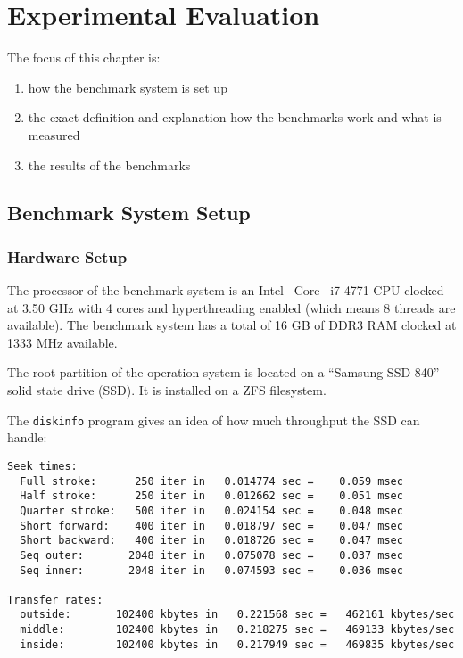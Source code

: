 \chapter{Experimental Evaluation}


The focus of this chapter is:
\begin{enumerate}
\item how the benchmark system is set up
\item the exact definition and explanation how the benchmarks work and what is measured
\item the results of the benchmarks
\end{enumerate}

%

\section{Benchmark System Setup}
  \subsection{Hardware Setup}

The processor of the benchmark system is an Intel\textregistered~ Core\texttrademark~ i7-4771 CPU clocked at 3.50 GHz with 4 cores and hyperthreading enabled (which means 8 threads are available).
The benchmark system has a total of 16 GB of DDR3 RAM clocked at 1333 MHz available.

The root partition of the operation system is located on a ``Samsung SSD 840'' solid state drive (SSD).
It is installed on a ZFS filesystem.

The \texttt{diskinfo} program gives an idea of how much throughput the SSD can handle:

\begin{lstlisting}[caption={Disk performance on the benchmark system}]
Seek times:
  Full stroke:      250 iter in   0.014774 sec =    0.059 msec
  Half stroke:      250 iter in   0.012662 sec =    0.051 msec
  Quarter stroke:   500 iter in   0.024154 sec =    0.048 msec
  Short forward:    400 iter in   0.018797 sec =    0.047 msec
  Short backward:   400 iter in   0.018726 sec =    0.047 msec
  Seq outer:       2048 iter in   0.075078 sec =    0.037 msec
  Seq inner:       2048 iter in   0.074593 sec =    0.036 msec

Transfer rates:
  outside:       102400 kbytes in   0.221568 sec =   462161 kbytes/sec
  middle:        102400 kbytes in   0.218275 sec =   469133 kbytes/sec
  inside:        102400 kbytes in   0.217949 sec =   469835 kbytes/sec
\end{lstlisting}

